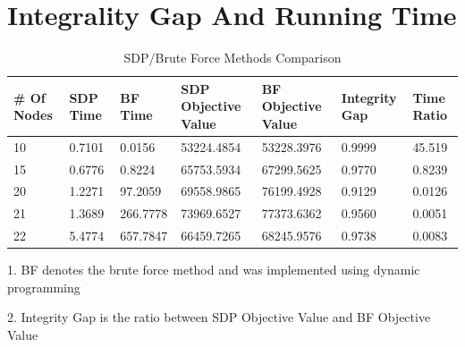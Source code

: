 \documentclass{article}
\begin{document}
\section{Integrality Gap And Running Time}
\begin{table}[!ht]
\begin{threeparttable}
\caption{SDP/Brute Force Methods Comparison}
\begin{tabular}{|l|l|l|l|l|l|l|}
\hline
\# Of Nodes & SDP  Time & BF Time  & SDP Objective Value & BF Objective Value & Integrity Gap & Time Ratio \\
\hline
10          & 0.7101    & 0.0156   & 53224.4854          & 53228.3976         & 0.9999        & 45.519     \\
15          & 0.6776    & 0.8224   & 65753.5934          & 67299.5625         & 0.9770        & 0.8239     \\
20          & 1.2271    & 97.2059  & 69558.9865          & 76199.4928         & 0.9129        & 0.0126     \\
21          & 1.3689    & 266.7778 & 73969.6527          & 77373.6362         & 0.9560        & 0.0051     \\
22          & 5.4774    & 657.7847 & 66459.7265          & 68245.9576         & 0.9738        & 0.0083     \\
 \hline
\end{tabular}
\begin{tablenotes}
      \small
      \item 1. BF denotes the brute force method and was implemented using dynamic programming
      \item 2. Integrity Gap is the ratio between SDP Objective Value and BF Objective Value\\
    \end{tablenotes}
\end{threeparttable}
\end{table}
\end{document}
